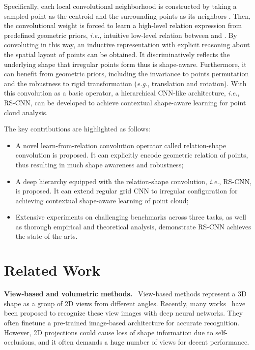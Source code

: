 \documentclass[10pt,twocolumn,letterpaper]{article}
\begin{document}
Specifically, each local convolutional neighborhood is constructed by taking a sampled point  as the centroid and the surrounding points as its neighbors .
Then, the convolutional weight is forced to learn a high-level relation expression from predefined geometric priors, \textit{i.e.}, intuitive low-level relation between  and .
By convoluting in this way, an inductive representation with explicit reasoning about the spatial layout of points can be obtained.
It discriminatively reflects the underlying shape that irregular points form thus is shape-aware.
Furthermore, it can benefit from geometric priors, including the invariance to points permutation and the robustness to rigid transformation (\textit{e.g.}, translation and rotation).
With this convolution as a basic operator, a hierarchical CNN-like architecture, \textit{i.e.}, RS-CNN, can be developed to achieve contextual shape-aware learning for point cloud analysis.

The key contributions are highlighted as follows:
\vspace{-3pt}
\begin{itemize}
\setlength{\itemsep}{0ex}
\item A novel learn-from-relation convolution operator called relation-shape convolution is proposed. It can explicitly encode geometric relation of points, thus resulting in much shape awareness and robustness;
\item A deep hierarchy equipped with the relation-shape convolution, \textit{i.e.}, RS-CNN, is proposed. It can extend regular grid CNN to irregular configuration for achieving contextual shape-aware learning of point cloud;
\item Extensive experiments on challenging benchmarks across three tasks, as well as thorough empirical and theoretical analysis, demonstrate RS-CNN achieves the state of the arts.
\end{itemize} 
\vspace{-11pt} 
\section{Related Work}
\label{sec:related work}
\noindent \textbf{View-based and volumetric methods.}\,\,~View-based methods represent a 3D shape as a group of 2D views from different angles. Recently, many works~\cite{multiview1,c37,multiview2,multiview3,c49,c51} have been proposed to recognize these view images with deep neural networks. They often finetune a pre-trained image-based architecture for accurate recognition. However, 2D projections could cause loss of shape information due to self-occlusions, and it often demands a huge number of views for decent performance.
\end{document}
